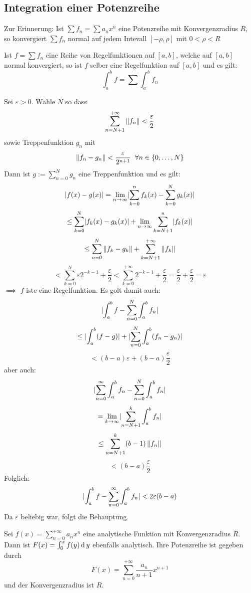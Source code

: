 \subsection{Integration einer Potenzreihe}
\begin{Sat}\label{s:1012080}
  Zur Erinnerung: Ist $\sum f_n=\sum a_nx^n$ eine Potenzreihe mit Konvergenzradius $R$, so konvergiert $\sum f_n$ normal auf jedem Intevall $[-\rho, \rho]$ mit $0<\rho<R$
\end{Sat}
\begin{Sat}\label{s:1012081}
  Ist $f=\sum f_n$ eine Reihe von Regelfunktionen auf $[a,b]$, welche auf $[a,b]$ normal konvergiert, so ist $f$ selber eine Regelfunktion auf $[a,b]$ und es gilt:
  \[\int_a^bf=\sum\int_a^bf_n\]
\end{Sat}
\begin{Bew}
  Sei $\varepsilon>0$. Wähle $N$ so dass
  \[\sum^{+\infty}_{n=N+1}\left\| f_n \right\|<\frac{\varepsilon}{2}\]
  sowie Treppenfunktion $g_n$ mit
  \[\left\| f_n-g_n \right\|<\frac{\varepsilon}{2^{n+1}}\hspace{2mm}\forall n\in\left\{ 0,\dots,N \right\}\]
  Dann ist $g:=\sum_{n=0}^Ng_n$ eine Treppenfunktion und es gilt:
  \[\mathopen| f(x)-g(x) \mathclose|=\displaystyle\lim_{n\rightarrow\infty}\mathopen| \sum_{k=0}^nf_k(x)-\sum^N_{k=0}g_k(x) \mathclose|\]
  \[\leq\sum_{k=0}^N\mathopen| f_k(x)-g_k(x) \mathclose|+\displaystyle\lim_{n\rightarrow\infty}\sum^n_{k=N+1}\mathopen| f_k(x) \mathclose|\]
  \[\leq\sum^N_{n=0}\left\| f_k-g_k \right\|+\sum^{+\infty}_{k=N+1}\left\| f_k \right\|\]
  \[<\sum_{k=0}^N\varepsilon 2^{-k-1}+\frac{\varepsilon}{2}<\sum^{+\infty}_{k=0}2^{-k-1}+\frac{\varepsilon}{2}=\frac{\varepsilon}{2}+\frac{\varepsilon}{2}=\varepsilon\]
  $\implies$ $f$ iste eine Regelfunktion. Es golt damit auch:
  \[\mathopen| \int_a^bf-\sum^N_{n=0}\int_a^bf_n \mathclose|\]
  \[\leq\mathopen| \int_a^b(f-g) \mathclose|+\mathopen| \sum_{n=0}^N\int_a^b(f_n-g_n) \mathclose|\]
  \[<(b-a)\varepsilon+(b-a)\frac{\varepsilon}{2}\]
  aber auch:
  \[\mathopen| \sum_{n=0}^\infty\int_a^bf_n-\sum_{n=0}^N\int_a^bf_n \mathclose|\]
  \[=\displaystyle\lim_{k\rightarrow\infty}\mathopen| \sum_{n=N+1}^k\int_a^bf_n \mathclose|\]
  \[\leq\sum^k_{n=N+1}(b-1)\left\| f_n \right\|\]
  \[<(b-a)\frac{\varepsilon}{2}\]
  Folglich:
  \[\mathopen| \int_a^bf-\sum_{n=0}^\infty\int_a^bf_n \mathclose|<2\varepsilon(b-a)\]
  Da $\varepsilon$ beliebig war, folgt die Behauptung.
\end{Bew}
\begin{Kor}
  Sei $f(x)=\sum_{n=0}^{+\infty}a_nx^n$ eine analytische Funktion mit Konvergenzradius $R$. Dann ist $F(x)=\int_0^xf(y)\operatorname{d} y$ ebenfalls analytisch. Ihre Potenzreihe ist gegeben durch
  \begin{equation}\label{e:1012083}
    F(x)=\sum^{+\infty}_{n=0}\frac{a_n}{n+1}x^{n+1}
  \end{equation}
  und der Konvergenzradius ist $R$.
\end{Kor}
